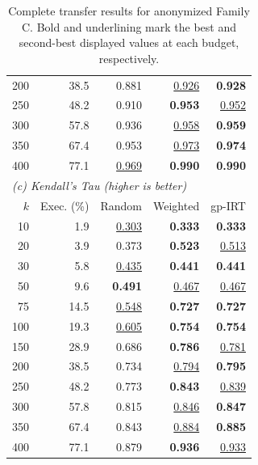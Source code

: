 \begin{table}[t]
\begin{tabular}{rrrrr}
    200 & 38.5 & 0.881 & \underline{0.926} & \textbf{0.928} \\
    250 & 48.2 & 0.910 & \textbf{0.953} & \underline{0.952} \\
    300 & 57.8 & 0.936 & \underline{0.958} & \textbf{0.959} \\
    350 & 67.4 & 0.953 & \underline{0.973} & \textbf{0.974} \\
    400 & 77.1 & \underline{0.969} & \textbf{0.990} & \textbf{0.990} \\
    \midrule
    \multicolumn{5}{l}{\textit{(c) Kendall's Tau (higher is better)}} \\
    $k$ & Exec. (\%) & Random & Weighted & gp-IRT \\
    \midrule
    10 & 1.9 & \underline{0.303} & \textbf{0.333} & \textbf{0.333} \\
    20 & 3.9 & 0.373 & \textbf{0.523} & \underline{0.513} \\
    30 & 5.8 & \underline{0.435} & \textbf{0.441} & \textbf{0.441} \\
    50 & 9.6 & \textbf{0.491} & \underline{0.467} & \underline{0.467} \\
    75 & 14.5 & \underline{0.548} & \textbf{0.727} & \textbf{0.727} \\
    100 & 19.3 & \underline{0.605} & \textbf{0.754} & \textbf{0.754} \\
    150 & 28.9 & 0.686 & \textbf{0.786} & \underline{0.781} \\
    200 & 38.5 & 0.734 & \underline{0.794} & \textbf{0.795} \\
    250 & 48.2 & 0.773 & \textbf{0.843} & \underline{0.839} \\
    300 & 57.8 & 0.815 & \underline{0.846} & \textbf{0.847} \\
    350 & 67.4 & 0.843 & \underline{0.884} & \textbf{0.885} \\
    400 & 77.1 & 0.879 & \textbf{0.936} & \underline{0.933} \\
    \bottomrule
  \end{tabular}
  \caption{Complete transfer results for anonymized Family C. Bold and underlining mark the best and second-best displayed values at each budget, respectively.}
  \label{tab:transfer-family-c-complete}
\end{table}
